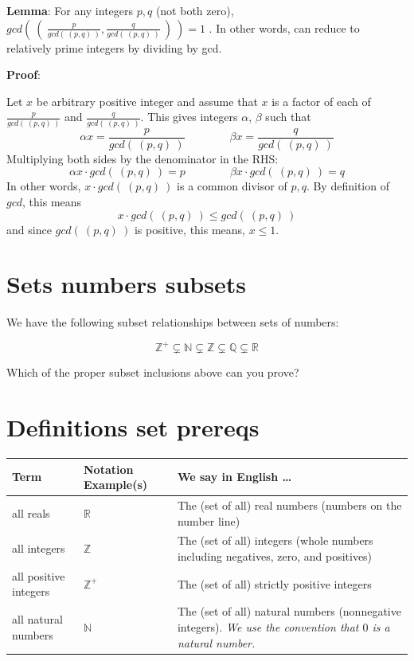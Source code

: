 \documentclass[12pt, oneside]{article}
\begin{document}
{\bf Lemma}: For any integers $p, q$ (not both zero), 
$gcd \left(~ \left(~\frac{p}{gcd(~(p,q)~)}, \frac{q}{gcd(~(p,q)~)} ~\right) ~\right) = 1$ .
In other words, can reduce to relatively prime integers by dividing by gcd.

{\bf Proof}:

Let $x$ be arbitrary positive integer and assume that $x$ is a 
factor of each of $\frac{p}{gcd(~(p,q)~)}$ and $\frac{q}{gcd(~(p,q)~)}$. 
This gives integers $\alpha$, $\beta$ such that 
\[
    \alpha x = \frac{p}{gcd(~(p,q)~)} \qquad \qquad \beta x = \frac{q}{gcd(~(p,q)~)}
\]
Multiplying both sides by the denominator in the RHS: 
\[
    \alpha x \cdot gcd(~(p,q)~)= p \qquad \qquad \beta x \cdot gcd(~(p,q)~)= q
\]
In other words, $x \cdot gcd(~(p,q)~)$ is a common divisor of $p, q$. By definition of $gcd$, this means
\[
    x \cdot gcd (~(p,q)~) \leq gcd (~(p,q)~)
\]
and since $gcd(~(p,q)~)$ is positive, this means, $x \leq 1$.
\vspace{350pt}
 \vfill
\section*{Sets numbers subsets}


We have the following subset relationships between sets of numbers:

\[
    \mathbb{Z}^{+} \subsetneq \mathbb{N} \subsetneq \mathbb{Z} \subsetneq \mathbb{Q} \subsetneq \mathbb{R}
\]


Which of the proper subset inclusions above can you prove?

\vspace{50pt} \vfill
\section*{Definitions set prereqs}


\begin{center}
\begin{tabular}{|llp{9.8cm}|}
\hline
{\bf Term} & {\bf Notation Example(s)} & {\bf We say in English \ldots } \\
\hline
all reals & $\mathbb{R}$ & The (set of all) real numbers (numbers on the number line)\\
all integers & $\mathbb{Z}$ & The (set of all) integers (whole numbers including negatives, zero, and positives) \\
all positive integers & $\mathbb{Z}^+$ & The (set of all) strictly positive integers \\
all natural numbers & $\mathbb{N}$ & The (set of all) natural numbers (nonnegative integers). {\it We use the convention that $0$ is a natural number.} \\


\hline
\end{tabular}
\end{center} \vfill
\end{document}
